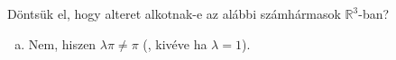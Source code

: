\begin{exercise}{%
    Döntsük el, hogy alteret alkotnak-e az alábbi számhármasok
    $\mathbb R^3$-ban?
  }
{\begin{enumerate}[a)]
\begin{enumerate}[1)]
              \item Skalárral való szorzásra való ellenőrzés:
                    $\forall \rvec a \in Q_1 \text{ és } \forall \lambda \in \mathbb R:
                      \lambda \rvec a \overset{?}{\in} Q_1$.
                    \[
                      \rvec a := \begin{pmatrix} a \\ -a \\ c \end{pmatrix}
                      \quad \rightarrow \quad
                      \lambda \rvec a
                      = \begin{pmatrix} \lambda a \\ \lambda (-a) \\ \lambda c \end{pmatrix}
                      = \begin{pmatrix} \lambda a \\ -(\lambda a) \\ \lambda c \end{pmatrix}
                      \in Q_1
                    \]
            \end{enumerate}

            \tcbline
      \item Nem, hiszen $\lambda \pi \neq \pi$ (, kivéve ha $\lambda = 1$).


\end{enumerate}}
\end{exercise}
